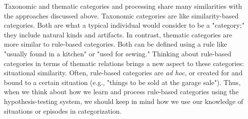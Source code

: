 \documentclass[../dissertation.tex]{subfiles}
\begin{document}
	Taxonomic and thematic categories and processing share many similarities with the approaches discussed above. Taxonomic categories are like similarity-based categories. Both are what a typical individual would consider to be a "category;" they include natural kinds and artifacts. In contrast, thematic categories are more similar to rule-based categories. Both can be defined using a rule like "usually found in a kitchen" or "used for sewing." Thinking about rule-based categories in terms of thematic relations brings a new aspect to these categories: situational similarity. Often, rule-based categories are \textit{ad hoc}, or created for and bound to a certain situation (e.g., "things to be sold at the garage sale"). Thus, when we think about how we learn and process rule-based categories using the hypothesis-testing system, we should keep in mind how we use our knowledge of situations or episodes in categorization. \par

			
\end{document}
